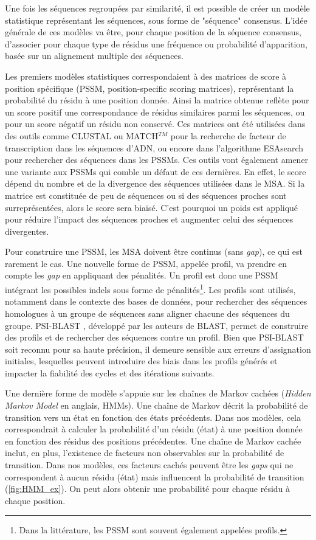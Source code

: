 Une fois les séquences regroupées par similarité, il est possible de créer un modèle statistique représentant les séquences, sous forme de "séquence" consensus. L'idée générale de ces modèles va être, pour chaque position de la séquence consensus, d'associer pour chaque type de résidus une fréquence ou probabilité d'apparition, basée sur un alignement multiple des séquences.

Les premiers modèles statistiques correspondaient à des matrices de score à position spécifique (PSSM, position-specific scoring matrices), représentant la probabilité du résidu à une position donnée. Ainsi la matrice obtenue reflète pour un score positif une correspondance de résidus similaires parmi les séquences, ou pour un score négatif un résidu non conservé. Ces matrices ont été utilisées dans des outils comme CLUSTAL \cite{higgins_clustal_1988} ou MATCH$^{TM}$ \cite{kel_matchtm_2003} pour la recherche de facteur de transcription dans les séquences d'ADN, ou encore dans l'algorithme ESAsearch \cite{beckstette_fast_2006} pour rechercher des séquences dans les PSSMs. Ces outils vont également amener une variante aux PSSMs qui comble un défaut de ces dernières. En effet, le score dépend du nombre et de la divergence des séquences utilisées dans le MSA. Si la matrice est constituée de peu de séquences ou si des séquences proches sont surreprésentées, alors le score sera biaisé. C'est pourquoi un poids est appliqué pour réduire l'impact des séquences proches et augmenter celui des séquences divergentes. 

Pour construire une PSSM, les MSA doivent être continus (sans \textit{gap}), ce qui est rarement le cas. Une nouvelle forme de PSSM, appelée profil, va prendre en compte les \textit{gap} en appliquant des pénalités. Un profil est donc une PSSM intégrant les possibles indels sous forme de pénalités\footnote{Dans la littérature, les PSSM sont souvent également appelées profils.}. Les profils sont utilisés, notamment dans le contexte des bases de données, pour rechercher des séquences homologues à un groupe de séquences sans aligner chacune des séquences du groupe. PSI-BLAST \cite{altschul_gapped_1997}, développé par les auteurs de BLAST, permet de construire des profils et de rechercher des séquences contre un profil. Bien que PSI-BLAST soit reconnu pour sa haute précision, il demeure sensible aux erreurs d'assignation initiales, lesquelles peuvent introduire des biais dans les profils générés et impacter la fiabilité des cycles et des itérations suivants.

Une dernière forme de modèle s'appuie sur les chaînes de Markov cachées (\textit{Hidden Markov Model} en anglais, HMMs). Une chaîne de Markov décrit la probabilité de transition vers un état en fonction des états précédents. Dans nos modèles, cela correspondrait à calculer la probabilité d'un résidu (état) à une position donnée en fonction des résidus des positions précédentes. Une chaîne de Markov cachée inclut, en plus, l'existence de facteurs non observables sur la probabilité de transition. Dans nos modèles, ces facteurs cachés peuvent être les \textit{gaps} qui ne correspondent à aucun résidu (état) mais influencent la probabilité de transition (\autoref{fig:HMM_ex}). On peut alors obtenir une probabilité pour chaque résidu à chaque position. 

